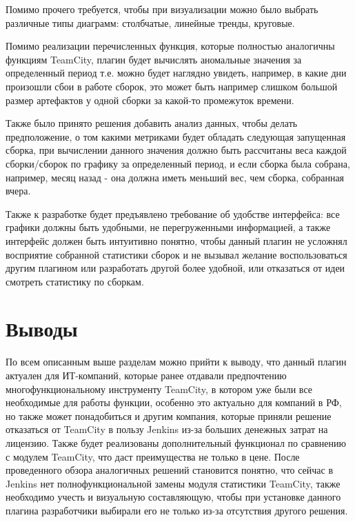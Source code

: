 Помимо прочего требуется, чтобы при визуализации можно было выбрать различные типы диаграмм: столбчатые, линейные тренды, круговые.

Помимо реализации перечисленных функция, которые полностью аналогичны функциям TeamCity, плагин будет вычислять аномальные значения за определенный период т.е. можно будет наглядно увидеть, например, в какие дни произошли сбои в работе сборок, это может быть например слишком большой размер артефактов у одной сборки за какой-то промежуток времени.

Также было принято решения добавить анализ данных, чтобы делать предположение, о том какими метриками будет обладать следующая запущенная сборка, при вычислении данного значения должно быть рассчитаны веса каждой сборки/сборок по графику за определенный период, и если сборка была собрана, например, месяц назад - она должна иметь меньший вес, чем сборка, собранная вчера.

Также к разработке будет предъявлено требование об удобстве интерфейса: все графики должны быть удобными, не перегруженными информацией, а также интерфейс должен быть интуитивно понятно, чтобы данный плагин не усложнял восприятие собранной статистики сборок и не вызывал желание воспользоваться другим плагином или разработать другой более удобной, или отказаться от идеи смотреть статистику по сборкам.

\section{Выводы} \label{ch1:sec7}

По всем описанным выше разделам можно прийти к выводу, что данный плагин актуален для ИТ-компаний, которые ранее отдавали предпочтению многофункциональному инструменту TeamCity, в котором уже были все необходимые для работы функции, особенно это актуально для компаний в РФ, но также может понадобиться и другим компания, которые приняли решение отказаться от TeamCity в пользу Jenkins из-за больших денежных затрат на лицензию. Также будет реализованы дополнительный функционал по сравнению с модулем TeamCity, что даст преимущества не только в цене. После проведенного обзора аналогичных решений становится понятно, что сейчас в Jenkins нет полнофункциональной замены модуля статистики TeamCity, также необходимо учесть и визуальную составляющую, чтобы при установке данного плагина разработчики выбирали его не только из-за отсутствия другого решения.













